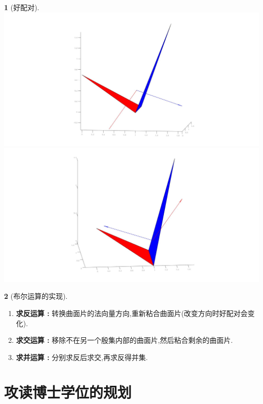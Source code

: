 \documentclass[UTF8]{ctexbeamer}	%
\theoremstyle{plain}
\theoremstyle{definition}
\newtheorem{emt}{}[section]
\theoremstyle{remark}
\numberwithin{equation}{section}
\begin{document}
\begin{frame}
    \begin{emt}[好配对]
            \centering
        \includegraphics[width = .6\textwidth]{fig/s3p2.jpg}
        \includegraphics[width = .6\textwidth]{fig/s3p3.jpg}
    \end{emt}
\end{frame}

\begin{frame}
    \begin{emt}[布尔运算的实现]
        \begin{enumerate}
            \setlength{\itemsep}{30pt}
            \item \textbf{求反运算 : } 转换曲面片的法向量方向,重新粘合曲面片(改变方向时好配对会变化).
            \item \textbf{求交运算 : } 移除不在另一个殷集内部的曲面片,然后粘合剩余的曲面片.
            \item \textbf{求并运算 : } 分别求反后求交,再求反得并集.
        \end{enumerate}
    \end{emt}
\end{frame}

\section{攻读博士学位的规划}
\end{document}
